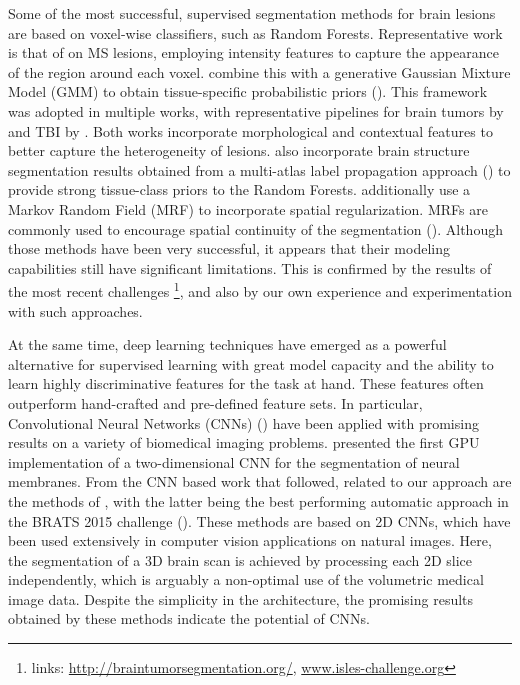 Some of the most successful, supervised segmentation methods for brain lesions are based on voxel-wise classifiers, such as Random Forests. Representative work is that of \cite{Geremia2010} on MS lesions, employing intensity features to capture the appearance of the region around each voxel. \cite{Zikic2012} combine this with a generative Gaussian Mixture Model (GMM) to obtain tissue-specific probabilistic priors (\cite{Leemput1999}). This framework was adopted in multiple works, with representative pipelines for brain tumors by \cite{tustison2013Brats} and TBI by \cite{Rao2014b}. Both works incorporate morphological and contextual features to better capture the heterogeneity of lesions. \cite{Rao2014b} also incorporate brain structure segmentation results obtained from a multi-atlas label propagation approach (\cite{Ledig2015}) to provide strong tissue-class priors to the Random Forests. \cite{tustison2013Brats} additionally use a Markov Random Field (MRF) to incorporate spatial regularization. MRFs are commonly used to encourage spatial continuity of the segmentation (\cite{Schmidt2012, Mitra2014}). Although those methods have been very successful, it appears that their modeling capabilities still have significant limitations. This is confirmed by the results of the most recent challenges \footnote{links: \href{http://braintumorsegmentation.org/}{http://braintumorsegmentation.org/}, \href{www.isles-challenge.org}{www.isles-challenge.org}}, and also by our own experience and experimentation with such approaches.  

At the same time, deep learning techniques have emerged as a powerful alternative for supervised learning with great model capacity and the ability to learn highly discriminative features for the task at hand. These features often outperform hand-crafted and pre-defined feature sets. In particular, Convolutional Neural Networks (CNNs) (\cite{LeCun1998, Krizhevsky2012}) have been applied with promising results on a variety of biomedical imaging problems. \cite{Ciresan2012} presented the first GPU implementation of a two-dimensional CNN for the segmentation of neural membranes. From the CNN based work that followed, related to our approach are the methods of \cite{zikic2014CnnBrats, Havei2015Journal, pereira2015Brats}, with the latter being the best performing automatic approach in the BRATS 2015 challenge (\cite{Menze2014}). These methods are based on 2D CNNs, which have been used extensively in computer vision applications on natural images. Here, the segmentation of a 3D brain scan is achieved by processing each 2D slice independently, which is arguably a non-optimal use of the volumetric medical image data. Despite the simplicity in the architecture, the promising results obtained by these methods indicate the potential of CNNs.

